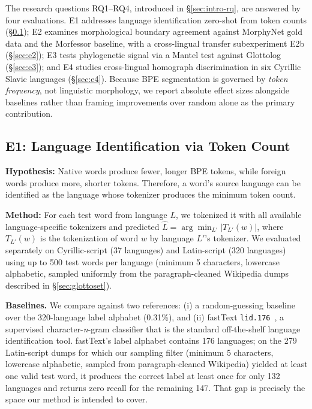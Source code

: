 \documentclass[11pt]{article}
\begin{document}
The research questions RQ1--RQ4, introduced in \S\ref{sec:intro-rq}, are answered by four evaluations. E1 addresses language identification zero-shot from token counts (\S\ref{sec:e1}); E2 examines morphological boundary agreement against MorphyNet gold data and the Morfessor baseline, with a cross-lingual transfer subexperiment E2b (\S\ref{sec:e2}); E3 tests phylogenetic signal via a Mantel test against Glottolog (\S\ref{sec:e3}); and E4 studies cross-lingual homograph discrimination in six Cyrillic Slavic languages (\S\ref{sec:e4}). Because BPE segmentation is governed by \emph{token frequency}, not linguistic morphology, we report absolute effect sizes alongside baselines rather than framing improvements over random alone as the primary contribution.

\subsection{E1: Language Identification via Token Count}
\label{sec:e1}

\textbf{Hypothesis:} Native words produce fewer, longer BPE tokens, while foreign words produce more, shorter tokens. Therefore, a word's source language can be identified as the language whose tokenizer produces the minimum token count.

\textbf{Method:} For each test word from language $L$, we tokenized it with all available language-specific tokenizers and predicted $\hat{L} = \arg\min_{L'} |T_{L'}(w)|$, where $T_{L'}(w)$ is the tokenization of word $w$ by language $L'$'s tokenizer. We evaluated separately on Cyrillic-script (37 languages) and Latin-script (320 languages) using up to 500 test words per language (minimum 5 characters, lowercase alphabetic, sampled uniformly from the paragraph-cleaned Wikipedia dumps described in \S\ref{sec:glottoset}).

\textbf{Baselines.} We compare against two references: (i) a random-guessing baseline over the 320-language label alphabet (0.31\%), and (ii) fastText \texttt{lid.176}~\citep{joulin2016bag}, a supervised character-\textit{n}-gram classifier that is the standard off-the-shelf language identification tool. fastText's label alphabet contains 176 languages; on the 279 Latin-script dumps for which our sampling filter (minimum 5 characters, lowercase alphabetic, sampled from paragraph-cleaned Wikipedia) yielded at least one valid test word, it produces the correct label at least once for only 132 languages and returns zero recall for the remaining 147. That gap is precisely the space our method is intended to cover.
\end{document}
